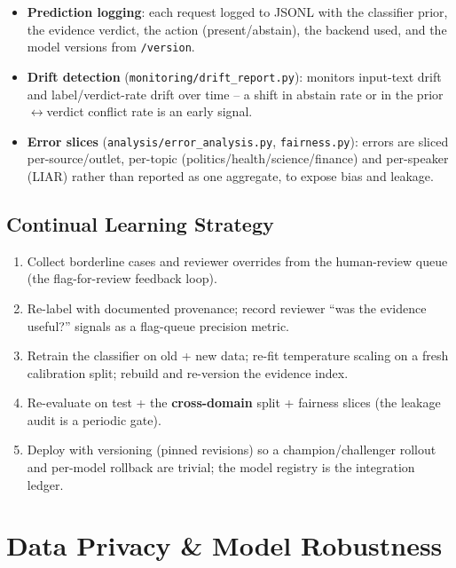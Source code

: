 \documentclass[12pt,a4paper]{article}
\begin{document}
\begin{itemize}\setlength\itemsep{0.15em}
  \item \textbf{Prediction logging}: each request logged to JSONL with the classifier prior, the evidence verdict, the action (present/abstain), the backend used, and the model versions from \texttt{/version}.
  \item \textbf{Drift detection} (\texttt{monitoring/drift\_report.py}): monitors input-text drift and label/verdict-rate drift over time -- a shift in abstain rate or in the prior$\leftrightarrow$verdict conflict rate is an early signal.
  \item \textbf{Error slices} (\texttt{analysis/error\_analysis.py}, \texttt{fairness.py}): errors are sliced per-source/outlet, per-topic (politics/health/science/finance) and per-speaker (LIAR) rather than reported as one aggregate, to expose bias and leakage.
\end{itemize}

\subsection{Continual Learning Strategy}

\begin{enumerate}\setlength\itemsep{0.15em}
  \item Collect borderline cases and reviewer overrides from the human-review queue (the flag-for-review feedback loop).
  \item Re-label with documented provenance; record reviewer ``was the evidence useful?'' signals as a flag-queue precision metric.
  \item Retrain the classifier on old + new data; re-fit temperature scaling on a fresh calibration split; rebuild and re-version the evidence index.
  \item Re-evaluate on test + the \textbf{cross-domain} split + fairness slices (the leakage audit is a periodic gate).
  \item Deploy with versioning (pinned revisions) so a champion/challenger rollout and per-model rollback are trivial; the model registry is the integration ledger.
\end{enumerate}

\section{Data Privacy \& Model Robustness}
\end{document}
